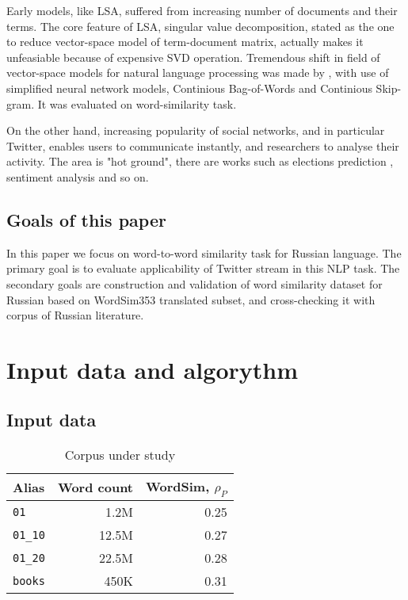 \documentclass[11pt,letterpaper]{article}
\begin{document}
Early models, like LSA, suffered from increasing number of documents and their terms. 
The core feature of LSA, singular value decomposition, stated as the one to reduce vector-space model 
of term-document matrix, actually makes it unfeasiable because of expensive SVD operation.
Tremendous shift in field of vector-space models for natural language processing was made 
by \cite{mikolov2013efficient}, with use of simplified neural network models, Continious Bag-of-Words
and Continious Skip-gram. It was evaluated on word-similarity task. 

On the other hand, increasing popularity of social networks, and in particular Twitter,
enables users to communicate instantly, and researchers to analyse their activity.
The area is "hot ground", there are works such as elections prediction \cite{metaxas2011not}, sentiment
analysis and so on.

\subsection{Goals of this paper}

In this paper we focus on word-to-word similarity task for Russian language. The primary goal
is to evaluate applicability of Twitter stream in this NLP task. The secondary goals are
construction and validation of word similarity dataset for Russian based on WordSim353 translated 
subset, and cross-checking it with corpus of Russian literature.


\section{Input data and algorythm}

\subsection{Input data}

\begin{table}
\begin{center}
\begin{tabular}{|l|r|r|}
\hline \bf Alias & \bf Word count & \bf WordSim, $\rho_P$  \\ \hline
{\tt 01} & 1.2M  & 0.25\\
{\tt 01\_10} & 12.5M & 0.27 \\
{\tt 01\_20} & 22.5M & 0.28 \\
{\tt books} & 450K & 0.31 \\
\hline
\end{tabular}
\end{center}
\caption{\label{chunk-size-table} Corpus under study }
\end{table}
\end{document}
